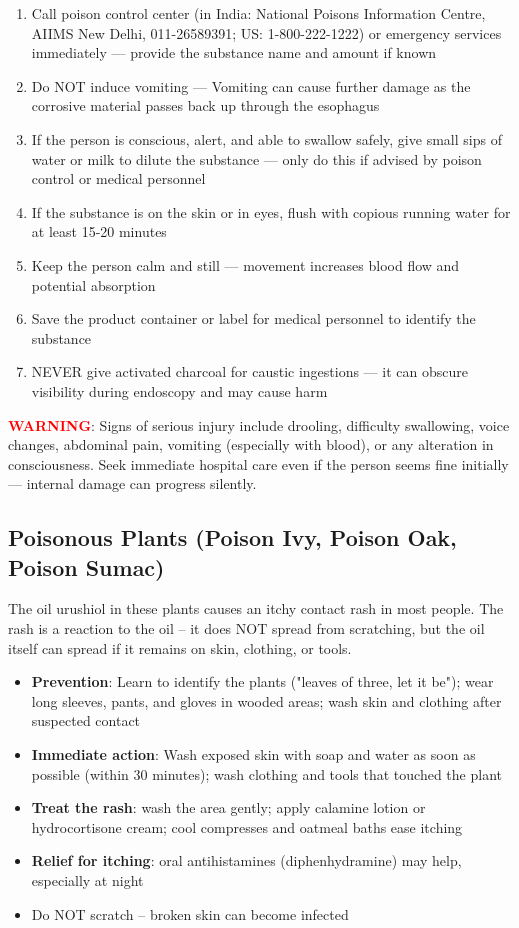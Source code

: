 \begin{enumerate}[leftmargin=*]
  \item Call poison control center (in India: National Poisons Information Centre, AIIMS New Delhi, 011-26589391; US: 1-800-222-1222) or emergency services immediately — provide the substance name and amount if known
  \item Do NOT induce vomiting — Vomiting can cause further damage as the corrosive material passes back up through the esophagus
  \item If the person is conscious, alert, and able to swallow safely, give small sips of water or milk to dilute the substance — only do this if advised by poison control or medical personnel
  \item If the substance is on the skin or in eyes, flush with copious running water for at least 15-20 minutes
  \item Keep the person calm and still — movement increases blood flow and potential absorption
  \item Save the product container or label for medical personnel to identify the substance
  \item NEVER give activated charcoal for caustic ingestions — it can obscure visibility during endoscopy and may cause harm
\end{enumerate}
\noindent\textbf{\textcolor{red}{WARNING}}: Signs of serious injury include drooling, difficulty swallowing, voice changes, abdominal pain, vomiting (especially with blood), or any alteration in consciousness. Seek immediate hospital care even if the person seems fine initially — internal damage can progress silently.

\subsection{Poisonous Plants (Poison Ivy, Poison Oak, Poison Sumac)}

The oil urushiol in these plants causes an itchy contact rash in most people. The rash is a reaction to the oil -- it does NOT spread from scratching, but the oil itself can spread if it remains on skin, clothing, or tools.

\begin{itemize}[leftmargin=*]
  \item \textbf{Prevention}: Learn to identify the plants ("leaves of three, let it be"); wear long sleeves, pants, and gloves in wooded areas; wash skin and clothing after suspected contact
  \item \textbf{Immediate action}: Wash exposed skin with soap and water as soon as possible (within 30 minutes); wash clothing and tools that touched the plant
  \item \textbf{Treat the rash}: wash the area gently; apply calamine lotion or hydrocortisone cream; cool compresses and oatmeal baths ease itching
  \item \textbf{Relief for itching}: oral antihistamines (diphenhydramine) may help, especially at night
  \item Do NOT scratch -- broken skin can become infected
\end{itemize}

